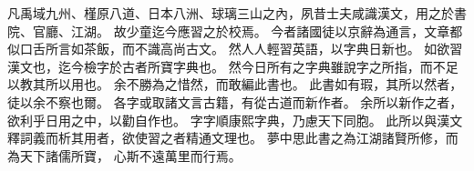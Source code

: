 凡禹域九州、槿原八道、日本八洲、球璃三山之內，夙昔士夫咸識漢文，用之於書院、官廳、江湖。
故少童迄今應習之於校焉。
今者諸國徒以京辭為通言，文章都似口舌所言如茶飯，而不識高尚古文。
然人人輕習英語，以字典日新也。
如欲習漢文也，迄今檢字於古者所寶字典也。
然今日所有之字典雖說字之所指，而不足以教其所以用也。
余不勝為之惜然，而敢編此書也。
此書如有瑕，其所以然者，徒以余不察也爾。
各字或取諸文言古籍，有從古道而新作者。
余所以新作之者，欲利乎日用之中，以勸自作也。
字字順康熙字典，乃慮天下同胞。
此所以與漢文釋詞義而析其用者，欲使習之者精通文理也。
夢中思此書之為江湖諸賢所修，而為天下諸儒所寶，
心斯不遠萬里而行焉。
